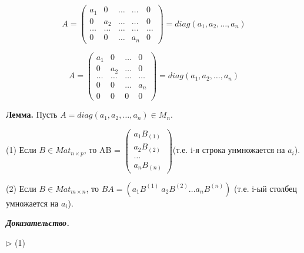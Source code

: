 \begin{comment}
	В дальнейшем понятие \glqq диагональной матрицы\grqq \  будет использоваться также и для неквадратных матриц, условие то же: $a_{ij} = 0 \ \forall  i \neq j$
\end{comment}

\begin{equation*}A =  \begin{pmatrix} a_1 & 0 & \dots & \dots & 0 \\ 0 & a_2 & \dots & \dots & 0  \\ \dots & \dots & \dots & \dots & \dots \\ 0 & 0 & \dots & a_n & 0 \end{pmatrix} = diag(a_1, a_2, \dots , a_n) \end{equation*}

\begin{equation*}A =  \begin{pmatrix} a_1 & 0 & \dots & 0 \\ 0 & a_2 & \dots & 0  \\ \dots & \dots & \dots & \dots \\ 0 & 0 & \dots & a_n \\ 0 & 0 & 0 & 0 \end{pmatrix} = diag(a_1, a_2, \dots , a_n) \end{equation*}

\bigskip
\textbf{Лемма.} Пусть $A = diag(a_1, a_2, \dots, a_n) \in M_n$.

\bigskip
(1) Если $B \in Mat_{n \times p}$, то AB = $\begin{pmatrix} a_1 B_{(1)} \\ a_2 B_{(2)} \\ \dots \\ a_n B_{(n)} \end{pmatrix} $(т.е. i-я строка унмножается на $a_i$).

\bigskip
(2) Если $B \in Mat_{m \times n}$, то $BA = (a_1 B^{(1)} \ a_2 B^{(2)} \dots a_n B^{(n)})$ (т.е. i-ый столбец умножается на $a_i$).

\textbf{\textit{Доказательство.}}

$\rhd$ (1)

